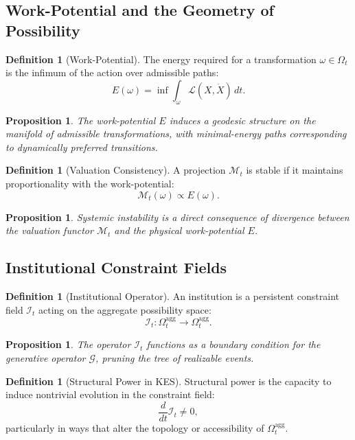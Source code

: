 \documentclass[11pt,a4paper]{article}
\newtheorem{proposition}[theorem]{Proposition}
\theoremstyle{definition}
\newtheorem{definition}[theorem]{Definition}
\theoremstyle{remark}
\begin{document}
\subsection{Work-Potential and the Geometry of Possibility}

\begin{definition}[Work-Potential]
The energy required for a transformation $\omega \in \Omega_t$ is the infimum of the action over admissible paths:
\[
E(\omega) = \inf \int_\omega \mathcal{L}(X, \dot{X}) \, dt.
\]
\end{definition}

\begin{proposition}
The work-potential $E$ induces a geodesic structure on the manifold of admissible transformations, with minimal-energy paths corresponding to dynamically preferred transitions.
\end{proposition}

\begin{definition}[Valuation Consistency]
A projection $\mathcal{M}_t$ is stable if it maintains proportionality with the work-potential:
\[
\mathcal{M}_t(\omega) \propto E(\omega).
\]
\end{definition}

\begin{proposition}
Systemic instability is a direct consequence of divergence between the valuation functor $\mathcal{M}_t$ and the physical work-potential $E$.
\end{proposition}

\subsection{Institutional Constraint Fields}

\begin{definition}[Institutional Operator]
An institution is a persistent constraint field $\mathcal{I}_t$ acting on the aggregate possibility space:
\[
\mathcal{I}_t : \Omega_t^{\mathrm{agg}} \to \Omega_t^{\mathrm{agg}}.
\]
\end{definition}

\begin{proposition}
The operator $\mathcal{I}_t$ functions as a boundary condition for the generative operator $\mathcal{G}$, pruning the tree of realizable events.
\end{proposition}

\begin{definition}[Structural Power in KES]
Structural power is the capacity to induce nontrivial evolution in the constraint field:
\[
\frac{d}{dt}\mathcal{I}_t \neq 0,
\]
particularly in ways that alter the topology or accessibility of $\Omega_t^{\mathrm{agg}}$.
\end{definition}
\end{document}
